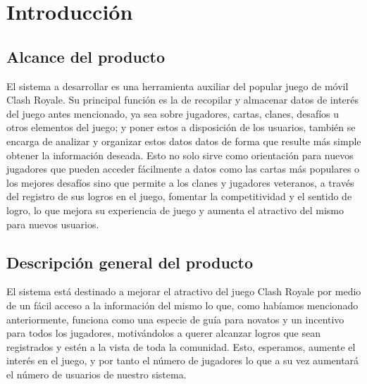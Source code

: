 %
%
%
%
\section{Introducción}

\subsection{Alcance del producto}

El sistema a desarrollar es una herramienta auxiliar del popular juego de móvil Clash Royale. Su principal función es la de recopilar y almacenar datos de interés del juego antes mencionado, ya sea sobre jugadores, cartas, clanes, desafíos u otros elementos del juego; y poner estos a disposición de los usuarios, también se encarga de analizar y organizar estos datos datos de forma que resulte más simple obtener la información deseada. Esto no solo sirve como orientación para nuevos jugadores que pueden acceder fácilmente a datos como las cartas más populares o los mejores desafíos sino que permite a los clanes y jugadores veteranos, a través del registro de sus logros en el juego, fomentar la competitividad y el sentido de logro, lo que mejora su experiencia de juego y aumenta el atractivo del mismo para nuevos usuarios.

\subsection{Descripción general del producto}

El sistema está destinado a mejorar el atractivo del juego Clash Royale por medio de un fácil acceso a la información del mismo lo que, como habíamos mencionado anteriormente, funciona como una especie de guía para novatos y un incentivo para todos los jugadores, motivándolos a querer alcanzar logros que sean registrados y estén a la vista de toda la comunidad. Esto, esperamos, aumente el interés en  el juego, y por tanto el número de jugadores lo que a su vez aumentará el número de usuarios de nuestro sistema. 

